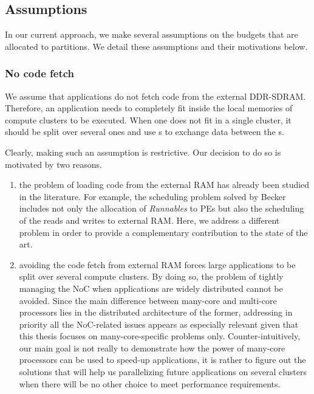 \documentclass[main.tex]{subfiles}
\begin{document}
\subsection{Assumptions}
In our current approach, we make several assumptions on the budgets that are allocated to partitions. We detail these assumptions and their motivations below.
\subsubsection{No code fetch}
We assume that applications do not fetch code from the external DDR-SDRAM. Therefore, an application needs to completely fit inside the local memories of compute clusters to be executed. When one does not fit in a single cluster, it should be split over several ones and use \PC{}s to exchange data between the \PN{}s. 

Clearly, making such an assumption is restrictive. Our decision to do so is motivated by two reasons. 
\begin{enumerate}
    \item the problem of loading code from the external RAM has already been studied in the literature. For example, the scheduling problem solved by Becker \etal~\cite{Becker16} includes not only the allocation of \emph{Runnables} to PEs but also the scheduling of the reads and writes to external RAM. Here, we address a different problem in order to provide a complementary contribution to the state of the art. 

    \item avoiding the code fetch from external RAM forces large applications to be split over several compute clusters. By doing so, the problem of tightly managing the NoC when applications are widely distributed cannot be avoided. Since the main difference between many-core and multi-core processors lies in the distributed architecture of the former, addressing in priority all the NoC-related issues appears as especially relevant given that this thesis focuses on many-core-specific problems only. Counter-intuitively, our main goal is not really to demonstrate how the power of many-core processors can be used to speed-up applications, it is rather to figure out the solutions that will help us parallelizing future applications on several clusters when there will be no other choice to meet performance requirements.
\end{enumerate}
\end{document}
